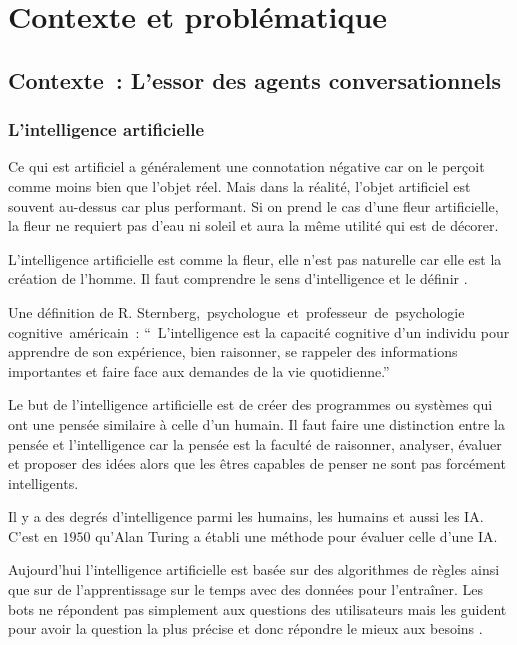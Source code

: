 \graphicspath{{contextProbImages/}}
\chapter{Contexte et problématique}

\section{Contexte : L'essor des agents conversationnels}

\subsection{L'intelligence artificielle}

Ce qui est artificiel a généralement une connotation négative car on le perçoit comme moins bien que l’objet réel. Mais dans la réalité, l’objet artificiel est souvent au-dessus car plus performant. Si on prend le cas d’une fleur artificielle, la fleur ne requiert pas d’eau ni soleil et aura la même utilité qui est de décorer.
\vspace{1em}

L’intelligence artificielle est comme la fleur, elle n’est pas naturelle car elle est la création de l’homme. Il faut comprendre le sens d’intelligence et le définir \cite{ref2}.
\vspace{1em}

	Une définition de R. Sternberg, psychologue et professeur de psychologie cognitive américain : “ L'intelligence est la capacité cognitive d'un individu pour apprendre de son expérience, bien raisonner, se rappeler des informations importantes et faire face aux demandes de la vie quotidienne.”
\vspace{1em}

	Le but de l’intelligence artificielle est de créer des programmes ou systèmes qui ont une pensée similaire à celle d’un humain. Il faut faire une distinction entre la pensée et l’intelligence car la pensée est la faculté de raisonner, analyser, évaluer et proposer des idées alors que les êtres capables de penser ne sont pas forcément intelligents.
	\vspace{1em}

	Il y a des degrés d’intelligence parmi les humains, les humains et aussi les IA. C’est en $1950$ qu’Alan Turing a établi une méthode pour évaluer celle d’une IA.
\vspace{1em}

	Aujourd’hui l’intelligence artificielle est basée sur des algorithmes de règles ainsi que sur de l’apprentissage sur le temps avec des données pour l’entraîner. Les bots ne répondent pas simplement aux questions des utilisateurs mais les guident pour avoir la question la plus précise et donc répondre le mieux aux besoins \cite{ref3}.
	\vspace{1em}


